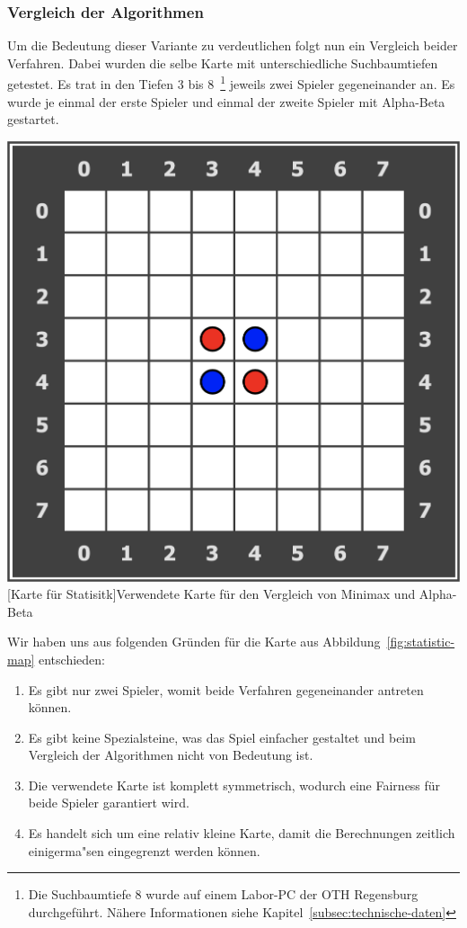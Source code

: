 \subsubsection{Vergleich der Algorithmen}\label{subsubsec:vergleich-der-algorithmen}
Um die Bedeutung dieser Variante zu verdeutlichen folgt nun ein Vergleich beider Verfahren.
Dabei wurden die selbe Karte mit unterschiedliche Suchbaumtiefen getestet.
Es trat in den Tiefen 3 bis 8~\footnote{Die Suchbaumtiefe 8 wurde auf einem Labor-PC der OTH Regensburg durchgef\"uhrt. N\"ahere Informationen siehe Kapitel~\ref{subsec:technische-daten}} jeweils zwei Spieler gegeneinander an.
Es wurde je einmal der erste Spieler und einmal der zweite Spieler mit Alpha-Beta gestartet.

\vspace{1em}
\begin{minipage}{\linewidth}
    \centering
    \includegraphics[width=0.3\linewidth]{pics/statistic-map}
    [Karte für Statisitk]{Verwendete Karte für den Vergleich von Minimax und Alpha-Beta}
    \label{fig:statistic-map}
\end{minipage}

Wir haben uns aus folgenden Gr\"unden f\"ur die Karte aus Abbildung~\ref{fig:statistic-map} entschieden:
\begin{enumerate}
    \item Es gibt nur zwei Spieler, womit beide Verfahren gegeneinander antreten k\"onnen.
    \item Es gibt keine Spezialsteine, was das Spiel einfacher gestaltet und beim Vergleich der Algorithmen nicht von Bedeutung ist.
    \item Die verwendete Karte ist komplett symmetrisch, wodurch eine Fairness f\"ur beide Spieler garantiert wird.
    \item Es handelt sich um eine relativ kleine Karte, damit die Berechnungen zeitlich einigerma"sen eingegrenzt werden k\"onnen.
\end{enumerate}

